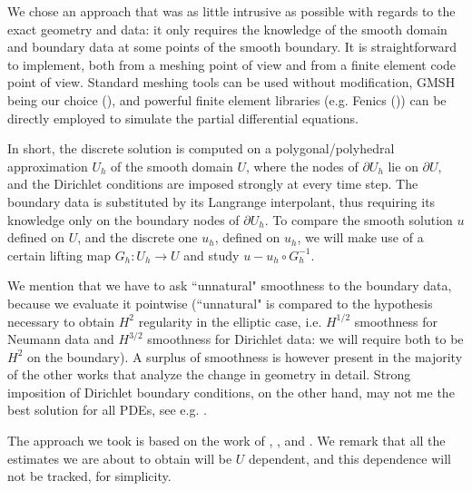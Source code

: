 \documentclass[english,a4paper,10pt,oneside]{scrbook}	%
\theoremstyle{break}
\theoremstyle{remark}
\begin{document}
\begin{appendices}
We chose an approach that was as little intrusive as possible with regards to the exact geometry and data: it only requires the knowledge of the smooth domain and boundary data at some points of the smooth boundary. It is straightforward to implement, both from a meshing point of view and from a finite element code point of view. Standard meshing tools can be used without modification, GMSH being our choice (\cite{gmsh}), and powerful finite element libraries (e.g. Fenics (\cite{fenics})) can be directly employed to simulate the partial differential equations.

In short, the discrete solution is computed on a polygonal/polyhedral approximation $U_h$ of the smooth domain $U$, where the nodes of $\partial U_h$ lie on $\partial U$, and the Dirichlet conditions are imposed strongly at every time step. The boundary data is substituted by its Langrange interpolant, thus requiring its knowledge only on the boundary nodes of $\partial U_h$. To compare the smooth solution $u$ defined on $U$, and the discrete one $u_h$, defined on $u_h$, we will make use of a certain lifting map $G_h : U_h\rightarrow U$ and study $u-u_h\circ G_h^{-1}$.

We mention that we have to ask ``unnatural" smoothness to the boundary data, because we evaluate it pointwise (``unnatural" is compared to the hypothesis necessary to obtain $H^2$ regularity in the elliptic case, i.e. $H^{1/2}$ smoothness for Neumann data and $H^{3/2}$ smoothness for Dirichlet data: we will require both to be $H^2$ on the boundary). A surplus of smoothness is however present in the majority of the other works that analyze the change in geometry in detail. Strong imposition of Dirichlet boundary conditions, on the other hand, may not me the best solution for all PDEs, see e.g. \cite{hughes}.

The approach we took is based on the work of \cite{elliott}, \cite{ranner}, \cite{bernardi} and \cite{edelmann}. We remark that all the estimates we are about to obtain will be $U$ dependent, and this dependence will not be tracked, for simplicity.




\end{appendices}
\end{document}
